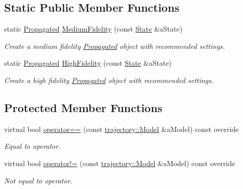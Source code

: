 \subsection*{Static Public Member Functions}
\begin{DoxyCompactItemize}
\item 
static \hyperlink{classostk_1_1astro_1_1trajectory_1_1orbit_1_1models_1_1_propagated}{Propagated} \hyperlink{classostk_1_1astro_1_1trajectory_1_1orbit_1_1models_1_1_propagated_ab6db8fa9347666164e78942ada36928a}{Medium\+Fidelity} (const \hyperlink{classostk_1_1astro_1_1trajectory_1_1_state}{State} \&a\+State)
\begin{DoxyCompactList}\small\item\em Create a medium fidelity \hyperlink{classostk_1_1astro_1_1trajectory_1_1orbit_1_1models_1_1_propagated}{Propagated} object with recommended settings. \end{DoxyCompactList}\item 
static \hyperlink{classostk_1_1astro_1_1trajectory_1_1orbit_1_1models_1_1_propagated}{Propagated} \hyperlink{classostk_1_1astro_1_1trajectory_1_1orbit_1_1models_1_1_propagated_a0cf68405428a87dabd0dd3327110cbc1}{High\+Fidelity} (const \hyperlink{classostk_1_1astro_1_1trajectory_1_1_state}{State} \&a\+State)
\begin{DoxyCompactList}\small\item\em Create a high fidelity \hyperlink{classostk_1_1astro_1_1trajectory_1_1orbit_1_1models_1_1_propagated}{Propagated} object with recommended settings. \end{DoxyCompactList}\end{DoxyCompactItemize}
\subsection*{Protected Member Functions}
\begin{DoxyCompactItemize}
\item 
virtual bool \hyperlink{classostk_1_1astro_1_1trajectory_1_1orbit_1_1models_1_1_propagated_a29b52ccf653fbd84699edab0f198f590}{operator==} (const \hyperlink{classostk_1_1astro_1_1trajectory_1_1_model}{trajectory\+::\+Model} \&a\+Model) const override
\begin{DoxyCompactList}\small\item\em Equal to operator. \end{DoxyCompactList}\item 
virtual bool \hyperlink{classostk_1_1astro_1_1trajectory_1_1orbit_1_1models_1_1_propagated_aeffaddcde5540fd1226add8466415d08}{operator!=} (const \hyperlink{classostk_1_1astro_1_1trajectory_1_1_model}{trajectory\+::\+Model} \&a\+Model) const override
\begin{DoxyCompactList}\small\item\em Not equal to operator. \end{DoxyCompactList}\end{DoxyCompactItemize}
